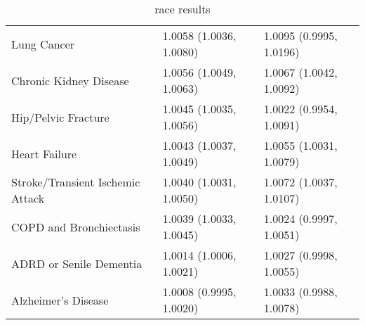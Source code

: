 \begin{table}[ht]
\begin{tabular}{lll}
  Lung Cancer & 1.0058 (1.0036, 1.0080) & 1.0095 (0.9995, 1.0196) \\ 
  Chronic Kidney Disease & 1.0056 (1.0049, 1.0063) & 1.0067 (1.0042, 1.0092) \\ 
  Hip/Pelvic Fracture & 1.0045 (1.0035, 1.0056) & 1.0022 (0.9954, 1.0091) \\ 
  Heart Failure & 1.0043 (1.0037, 1.0049) & 1.0055 (1.0031, 1.0079) \\ 
  Stroke/Transient Ischemic Attack & 1.0040 (1.0031, 1.0050) & 1.0072 (1.0037, 1.0107) \\ 
  COPD and Bronchiectasis & 1.0039 (1.0033, 1.0045) & 1.0024 (0.9997, 1.0051) \\ 
  ADRD or Senile Dementia & 1.0014 (1.0006, 1.0021) & 1.0027 (0.9998, 1.0055) \\ 
  Alzheimer's Disease & 1.0008 (0.9995, 1.0020) & 1.0033 (0.9988, 1.0078) \\ 
   \hline
\end{tabular}
\caption{race results} 
\label{tab:stratified_OR_white_black}
\end{table}
